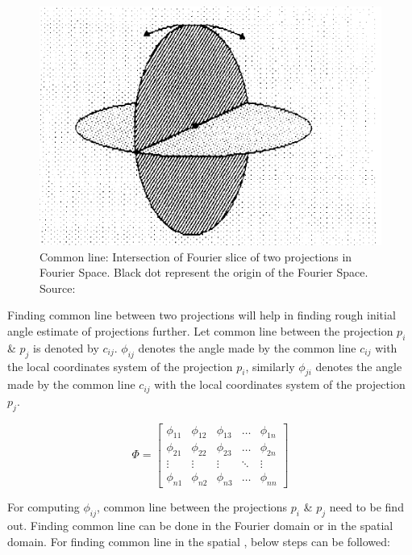 \documentclass{report}
\begin{document}
\begin{figure}[h]
\includegraphics[width=0.7\linewidth]{3dr_plane_intersection.png}
\centering
\captionsetup{justification=centering}
\caption{Common line: Intersection of Fourier slice of two projections in Fourier Space. Black dot represent the origin of the Fourier Space. Source:  \cite{van1987angular} }
\label{fig: 3dr_plane_intersection}
\end{figure}

Finding common line between two projections will help in finding rough initial angle estimate of projections further. Let common line between the projection ${p_i}$ \& ${p_j}$ is denoted by ${c_{ij}}$. ${\phi_{ij}}$ denotes the angle made by the common line ${c_{ij}}$ with the local coordinates system of the projection ${p_i}$, similarly ${\phi_{ji}}$ denotes the angle made by the common line ${c_{ij}}$ with the local coordinates system of the projection ${p_j}$. 

\[\label{eq:commonline_phi}
\Phi
=
\begin{bmatrix}
    \phi_{11} & \phi_{12} & \phi_{13} & \dots  & \phi_{1n} \\
    \phi_{21} & \phi_{22} & \phi_{23} & \dots  & \phi_{2n} \\
    \vdots & \vdots & \vdots & \ddots & \vdots \\
    \phi_{n1} & \phi_{n2} & \phi_{n3} & \dots  & \phi_{nn}
\end{bmatrix}
\]

For computing ${\phi_{ij}}$, common line between the projections  ${p_i}$ \& ${p_j}$ need to be find out. Finding common line can be done in the Fourier domain or in the spatial domain. For finding common line in the spatial , below steps can be followed:
\end{document}
